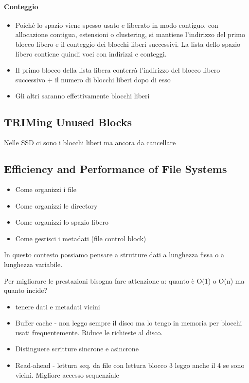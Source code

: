 \paragraph{Conteggio}

\begin{itemize}
  \item Poiché lo spazio viene spesso usato e liberato in modo contiguo, con allocazione contigua, estensioni o clustering, si mantiene l'indirizzo del primo blocco libero e il conteggio dei blocchi liberi successivi. La lista dello spazio libero contiene quindi voci con indirizzi e conteggi.
  \item Il primo blocco della lista libera conterrà l'indirizzo del blocco libero successivo + il numero di blocchi liberi dopo di esso
  \item Gli altri saranno effettivamente blocchi liberi
\end{itemize}


\subsection{TRIMing Unused Blocks}

Nelle SSD ci sono i blocchi liberi ma ancora da cancellare

\subsection{Efficiency and Performance of File Systems}

\begin{itemize}
  \item Come organizzi i file
  \item Come organizzi le directory
  \item Come organizzi lo spazio libero
  \item Come gestisci i metadati (file control block)
\end{itemize}

In questo contesto possiamo pensare a strutture dati a lunghezza fissa
o a lunghezza variabile.

Per migliorare le prestazioni bisogna fare attenzione a:
quanto è O(1) o O(n) ma quanto incide?

\begin{itemize}
  \item tenere dati e metadati vicini
  \item Buffer cache - non leggo sempre il disco ma lo tengo in memoria per blocchi usati frequentemente. Riduce le richieste al disco.
  \item Distinguere scritture sincrone e asincrone
  \item Read-ahead - lettura seq. da file con lettura blocco 3 leggo anche il 4 se sono vicini. Migliore accesso sequenziale
\end{itemize}


